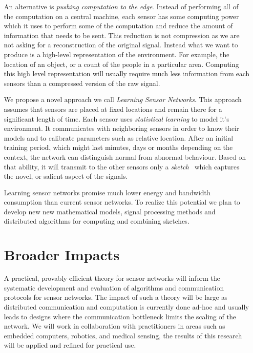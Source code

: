 \documentclass{article}
\begin{document}
An alternative is {\em pushing computation to the edge}. Instead of
performing all of the computation on a central machine, each sensor
has some computing power which it uses to perform some of the
computation and reduce the amount of information that needs to be
sent. This reduction is not compression as we are not asking for a
reconstruction of the original signal. Instead what we want to produce
is a high-level representation of the environment. For example, the
location of an object, or a count of the people in a particular
area. Computing this high level representation will usually require
much less information from each sensors than a compressed version of
the raw signal.

We propose a novel approach we call {\em Learning Sensor Networks}.
This approach assumes that sensors are placed at fixed locations and
remain there for a significant length of time.  Each sensor uses {\em
  statistical learning} to model it's environment. It communicates
with neighboring sensors in order to know their models and to
calibrate parameters such as relative location. After an initial
training period, which might last minutes, days or months depending on
the context, the network can distinguish normal from abnormal
behaviour. Based on that ability, it will transmit to the other
sensors only a {\em sketch}~\cite{rahimi2008random} which captures the novel, or
salient aspect of the signals.

Learning sensor networks promise much lower energy and bandwidth
consumption than current sensor networks. To realize this potential we
plan to develop new new mathematical models, signal processing methods
and distributed algorithms for computing and combining sketches.
\fi



\section{Broader Impacts}
A practical, provably efficient theory for sensor networks will inform the systematic development and evaluation of algorithms and communication protocols for sensor networks. 
The impact of such a theory will be large as distributed communication and computation is currently done ad-hoc and usually leads to designs where the communication bottleneck limits the scaling of the network. We will work in collaboration with practitioners in areas such as embedded computers, robotics, and medical sensing, the results of this research will be applied and refined for practical use. 
\end{document}
